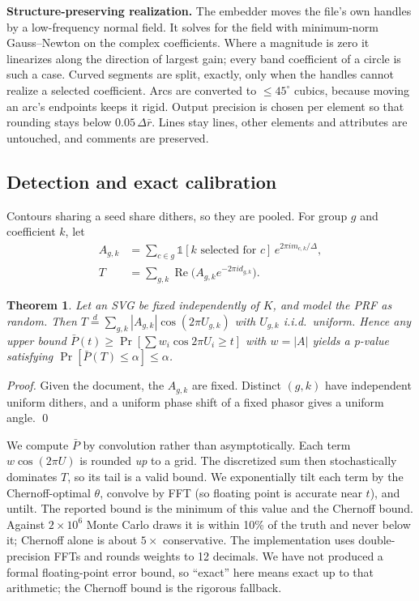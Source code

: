 \documentclass[10pt,twocolumn]{article}
\newtheorem{theorem}{Theorem}
\begin{document}
\textbf{Structure-preserving realization.} The embedder moves the file's own handles by a low-frequency normal field. It solves for the field with minimum-norm Gauss--Newton on the complex coefficients. Where a magnitude is zero it linearizes along the direction of largest gain; every band coefficient of a circle is such a case. Curved segments are split, exactly, only when the handles cannot realize a selected coefficient. Arcs are converted to $\le 45^\circ$ cubics, because moving an arc's endpoints keeps it rigid. Output precision is chosen per element so that rounding stays below $0.05\,\Delta\bar r$. Lines stay lines, other elements and attributes are untouched, and comments are preserved.

\subsection{Detection and exact calibration}
\label{sec:detect}
Contours sharing a seed share dithers, so they are pooled. For group $g$ and coefficient $k$, let
\begin{align*}
A_{g,k}&=\sum_{c\in g}\mathbb 1[k\text{ selected for }c]\,e^{2\pi i m_{c,k}/\Delta},\\
T&=\sum_{g,k}\operatorname{Re}\big(A_{g,k}e^{-2\pi i d_{g,k}}\big).
\end{align*}
\begin{theorem}
Let an SVG be fixed independently of $K$, and model the PRF as random. Then $T\stackrel{d}{=}\sum_{g,k}|A_{g,k}|\cos(2\pi U_{g,k})$ with $U_{g,k}$ i.i.d.\ uniform. Hence any upper bound $\bar P(t)\ge\Pr[\sum w_i\cos 2\pi U_i\ge t]$ with $w=|A|$ yields a p-value satisfying $\Pr[\bar P(T)\le\alpha]\le\alpha$.
\end{theorem}
\emph{Proof.} Given the document, the $A_{g,k}$ are fixed. Distinct $(g,k)$ have independent uniform dithers, and a uniform phase shift of a fixed phasor gives a uniform angle. \qed

We compute $\bar P$ by convolution rather than asymptotically. Each term $w\cos(2\pi U)$ is rounded \emph{up} to a grid. The discretized sum then stochastically dominates $T$, so its tail is a valid bound. We exponentially tilt each term by the Chernoff-optimal $\theta$, convolve by FFT (so floating point is accurate near $t$), and untilt. The reported bound is the minimum of this value and the Chernoff bound. Against $2\times10^6$ Monte Carlo draws it is within 10\% of the truth and never below it; Chernoff alone is about $5\times$ conservative. The implementation uses double-precision FFTs and rounds weights to 12 decimals. We have not produced a formal floating-point error bound, so ``exact'' here means exact up to that arithmetic; the Chernoff bound is the rigorous fallback.
\end{document}
